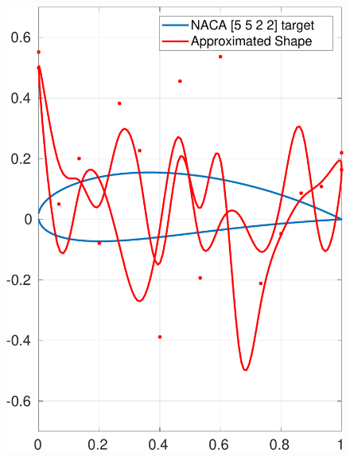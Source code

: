 \documentclass[paper=a4, fontsize=11pt]{scrartcl} %
\begin{document}
    \begin{figure}[H]
        \centering
        \begin{minipage}{.5\textwidth}
            \centering
            \includegraphics[width=.95\linewidth]{a3-shapematch-5522-init}
            \label{fig:initial5522}
        \end{minipage}%
        \begin{minipage}{.5\textwidth}
            \centering

\end{minipage}
\end{figure}
\end{document}
